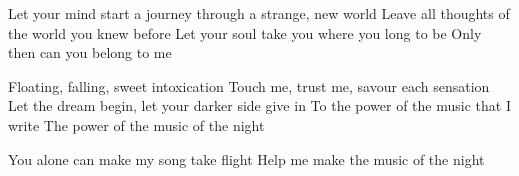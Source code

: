 \documentclass[../../../songbook.tex]{subfiles}
\begin{document}
\-\hspace{0.5cm} Let your mind start a journey through a strange, new world	 \newline
\-\hspace{0.5cm} Leave all thoughts of the world you knew before				 \newline
\-\hspace{0.5cm} Let your soul take you where you long to be					 \newline
\-\hspace{0.5cm} Only then can you belong to me								 \newline

Floating, falling, sweet intoxication				\newline
Touch me, trust me, savour each sensation			\newline
Let the dream begin, let your darker side give in	\newline
To the power of the music that I write		 		\newline
The power of the music of the night					 \newline

\-\hspace{0.5cm} You alone can make my song take flight		 \newline
\-\hspace{0.5cm} Help me make the music of the night		 \newline
\end{document}
